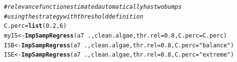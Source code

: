 \documentclass[10pt,a4paper]{article}\usepackage[]{graphicx}\usepackage[]{color}
\makeatletter
\newcommand{\hlnum}[1]{\textcolor[rgb]{0.686,0.059,0.569}{#1}}%
\newcommand{\hlstr}[1]{\textcolor[rgb]{0.192,0.494,0.8}{#1}}%
\newcommand{\hlcom}[1]{\textcolor[rgb]{0.678,0.584,0.686}{\textit{#1}}}%
\newcommand{\hlopt}[1]{\textcolor[rgb]{0,0,0}{#1}}%
\newcommand{\hlstd}[1]{\textcolor[rgb]{0.345,0.345,0.345}{#1}}%
\newcommand{\hlkwb}[1]{\textcolor[rgb]{0.69,0.353,0.396}{#1}}%
\newcommand{\hlkwc}[1]{\textcolor[rgb]{0.333,0.667,0.333}{#1}}%
\newcommand{\hlkwd}[1]{\textcolor[rgb]{0.737,0.353,0.396}{\textbf{#1}}}%
\newenvironment{kframe}{%
 \def\at@end@of@kframe{}%
 \ifinner\ifhmode%
  \def\at@end@of@kframe{\end{minipage}}%
  \begin{minipage}{\columnwidth}%
 \fi\fi%
 \def\FrameCommand##1{\hskip\@totalleftmargin \hskip-\fboxsep
 \colorbox{shadecolor}{##1}\hskip-\fboxsep
     \hskip-\linewidth \hskip-\@totalleftmargin \hskip\columnwidth}%
 \MakeFramed {\advance\hsize-\width
   \@totalleftmargin\z@ \linewidth\hsize
   \@setminipage}}%
 {\par\unskip\endMakeFramed%
 \at@end@of@kframe}
\newenvironment{knitrout}{}{} %
\makeatother
\begin{document}
\begin{knitrout}\footnotesize
{}\color{fgcolor}\begin{kframe}
\begin{alltt}
\hlcom{# relevance function estimated automatically has two bumps}
\hlcom{# using the strategy with threshold definition}
\hlstd{C.perc}\hlkwb{=}\hlkwd{list}\hlstd{(}\hlnum{0.2}\hlstd{,}\hlnum{6}\hlstd{)}
\hlstd{myIS} \hlkwb{<-} \hlkwd{ImpSampRegress}\hlstd{(a7}\hlopt{~}\hlstd{., clean.algae,} \hlkwc{thr.rel}\hlstd{=}\hlnum{0.8}\hlstd{,}\hlkwc{C.perc}\hlstd{=C.perc)}
\hlstd{ISB} \hlkwb{<-} \hlkwd{ImpSampRegress}\hlstd{(a7}\hlopt{~}\hlstd{., clean.algae,} \hlkwc{thr.rel}\hlstd{=}\hlnum{0.8}\hlstd{,} \hlkwc{C.perc}\hlstd{=}\hlstr{"balance"}\hlstd{)}
\hlstd{ISE} \hlkwb{<-} \hlkwd{ImpSampRegress}\hlstd{(a7}\hlopt{~}\hlstd{., clean.algae,} \hlkwc{thr.rel}\hlstd{=}\hlnum{0.8}\hlstd{,} \hlkwc{C.perc}\hlstd{=}\hlstr{"extreme"}\hlstd{)}
\end{alltt}
\end{kframe}
\end{knitrout}
\end{document}
